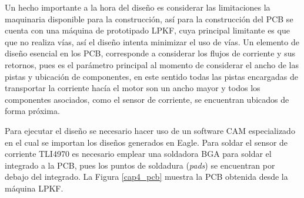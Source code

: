 Un hecho importante a la hora del diseño es considerar las limitaciones la maquinaria disponible para la construcción, así para la construcción del PCB se cuenta con una máquina de prototipado LPKF\textregistered,  cuya principal limitante es que que no realiza vías, así el diseño intenta minimizar el uso de vías. Un elemento de diseño esencial en los PCB, corresponde a considerar los flujos de corriente y sus retornos, pues es el parámetro principal al momento de considerar el ancho de las pistas y ubicación de componentes, en este sentido todas las pistas encargadas de transportar la corriente hacía el motor son un ancho mayor y todos los componentes asociados, como el sensor de corriente, se encuentran ubicados de forma próxima.

Para ejecutar el diseño se necesario hacer uso de un software CAM especializado en el cual se importan los diseños generados en Eagle\textregistered.  Para soldar el sensor de corriente TLI4970 es necesario emplear una soldadora BGA para soldar el integrado a la PCB, pues los puntos de soldadura (\textit{pads}) se encuentran por debajo del integrado. La Figura \ref{cap4_pcb} muestra la PCB obtenida desde la máquina LPKF\textregistered.


